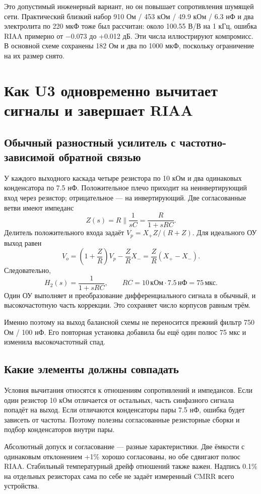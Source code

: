 \documentclass[a4paper,11pt]{article}
\newcommand{\kOhm}{\,\text{кОм}}
\newcommand{\nF}{\,\text{нФ}}
\newcommand{\mkS}{\,\text{мкс}}
\begin{document}
Это допустимый инженерный вариант, но он повышает сопротивления шумящей сети.
Практический близкий набор 910 Ом / 453 кОм / 49.9 кОм / 6.3 нФ и два
электролита по 220 мкФ тоже был рассчитан: около 100.55 В/В на 1 кГц,
ошибка RIAA примерно от −0.073 до +0.012 дБ.
Эти числа иллюстрируют компромисс. В основной схеме сохранены 182 Ом и
два по 1000 мкФ, поскольку ограничение на их размер снято.

\section{Как U3 одновременно вычитает сигналы и завершает RIAA}

\subsection{Обычный разностный усилитель с частотно-зависимой обратной связью}

У каждого выходного каскада четыре резистора по 10 кОм и два одинаковых
конденсатора по 7.5 нФ. Положительное плечо приходит на неинвертирующий вход
через резистор; отрицательное — на инвертирующий. Две согласованные ветви
имеют импеданс
\[
 Z(s)=R\parallel\frac1{sC}=\frac{R}{1+sRC}.
\]
Делитель положительного входа задаёт
$V_p=X_+Z/(R+Z)$. Для идеального ОУ выход равен
\[
 V_o=\left(1+\frac ZR\right)V_p-\frac ZR X_-
     =\frac ZR(X_+-X_-).
\]
Следовательно,
\[
 H_2(s)=\frac1{1+sRC},\qquad RC=10\kOhm\cdot7.5\nF=75\mkS.
\]
Один ОУ выполняет и преобразование дифференциального сигнала в обычный,
и высокочастотную часть коррекции. Это сохраняет число корпусов равным трём.

Именно поэтому на выход балансной схемы не переносится прежний фильтр
750 Ом / 100 нФ. Его повторная установка добавила бы ещё один полюс 75 мкс
и изменила высокочастотный спад.

\subsection{Какие элементы должны совпадать}

Условия вычитания относятся к отношениям сопротивлений и импедансов.
Если один резистор 10 кОм отличается от остальных, часть синфазного сигнала
попадёт на выход. Если отличаются конденсаторы пары 7.5 нФ, ошибка будет
зависеть от частоты. Поэтому полезны согласованные резисторные сборки
и подбор конденсаторов внутри пары.

Абсолютный допуск и согласование — разные характеристики. Две ёмкости
с одинаковым отклонением +1\% хорошо согласованы, но обе сдвигают полюс RIAA.
Стабильный температурный дрейф отношений также важен. Надпись 0.1\% на
отдельных резисторах сама по себе не задаёт измеренный CMRR всего устройства.
\end{document}
